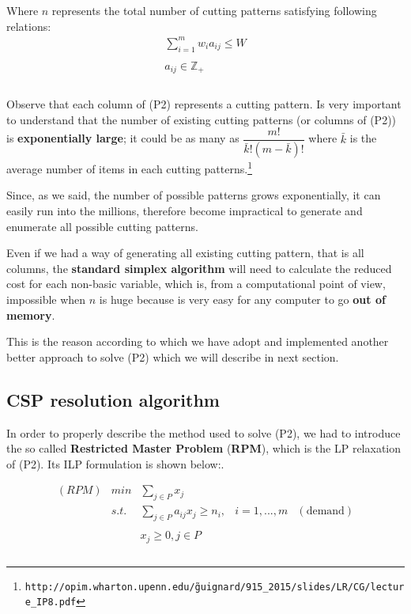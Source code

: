 \documentclass[10pt,a4paper]{article}
\begin{document}
Where $n$ represents the total number of cutting patterns satisfying following relations:
\begin{equation}
\begin{array} {c} 
\displaystyle\sum_{i=1}^m w_i a_{ij} \leq W \\\\ a_{ij} \in \mathbb{Z}_{+}\\\\
\end{array}
\end{equation}

Observe that each column of (P2) represents a cutting pattern. Is very important to understand that the number of existing cutting patterns (or columns of (P2)) is \textbf{exponentially large}; it could be as many as $\dfrac{m!}{\bar{k}!(m-\bar{k})!}$ where $\bar{k}$ is the average number of items in each cutting patterns.\footnote{\texttt{http://opim.wharton.upenn.edu/\~guignard/915\_2015/slides/LR/CG/lecture\_IP8.pdf}}

Since, as we said, the number of possible patterns grows exponentially, it can easily run into the millions, therefore become impractical to generate and enumerate all possible cutting patterns. 

Even if we had a way of generating all existing cutting pattern, that is all columns, the \textbf{standard simplex algorithm} will need to calculate the reduced cost for each non-basic variable, which is, from a computational point of view, impossible when $n$ is huge because is very easy for any computer to go \textbf{out of memory}.

This is the reason according to which we have adopt and implemented another better approach to solve (P2) which we will describe in next section.

\newpage
\subsection{CSP resolution algorithm}\label{cspresolalg}

In order to properly describe the method used to solve (P2), we had to introduce the so called \textbf{Restricted Master Problem} (\textbf{RPM}), which is the LP relaxation of (P2). Its ILP formulation is shown below:.

\begin{equation}\label{eqn:RPM}
\begin{array} {lllrr} 

(RPM) & min & \displaystyle\sum_{j \in P} x_j && \\
& s.t. & \displaystyle\sum_{j \in P} a_{ij} x_j \geq n_i, & i = 1,...,m & (\text{demand}) \\\\
& & x_j \geq 0, j \in P  && \\\\
\end{array}
\end{equation}
\end{document}
